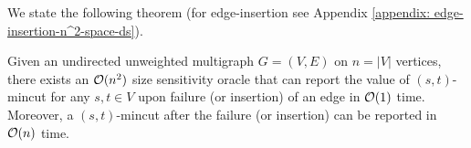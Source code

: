 We state the following theorem (for edge-insertion see Appendix \ref{appendix: edge-insertion-n^2-space-ds}).

\begin{theorem}
Given an undirected unweighted multigraph $G=(V,E)$ on $n=|V|$ vertices, there exists an
${\cal O}(n^2)$ size sensitivity oracle that can report the value of $(s,t)$-mincut for any $s,t \in V$ upon failure (or insertion) of an edge in ${\cal O}(1)$ time. Moreover, a $(s,t)$-mincut 
after the failure (or insertion) 
can be reported in ${\cal O}(n)$ time.
\label{thm:O(n^2)-size-data-structure}
\end{theorem}








